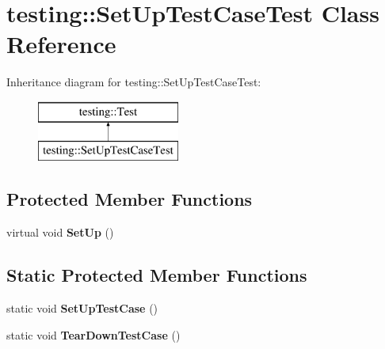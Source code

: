 \hypertarget{classtesting_1_1_set_up_test_case_test}{}\section{testing\+:\+:Set\+Up\+Test\+Case\+Test Class Reference}
\label{classtesting_1_1_set_up_test_case_test}
Inheritance diagram for testing\+:\+:Set\+Up\+Test\+Case\+Test\+:\begin{figure}[H]
\begin{center}
\leavevmode
\includegraphics[height=2.000000cm]{classtesting_1_1_set_up_test_case_test}
\end{center}
\end{figure}
\subsection*{Protected Member Functions}
\begin{DoxyCompactItemize}
\item 
\mbox{\label{classtesting_1_1_set_up_test_case_test_a4b44551ccf73e66de7ec95b2ab3b2085}} 
virtual void {\bfseries Set\+Up} ()
\end{DoxyCompactItemize}
\subsection*{Static Protected Member Functions}
\begin{DoxyCompactItemize}
\item 
\mbox{\label{classtesting_1_1_set_up_test_case_test_a50732abc0bcb3725e6dfd6a2d487e944}} 
static void {\bfseries Set\+Up\+Test\+Case} ()
\item 
\mbox{\label{classtesting_1_1_set_up_test_case_test_abdc133cd161ff2fa317f489da9bdccf3}} 
static void {\bfseries Tear\+Down\+Test\+Case} ()
\end{DoxyCompactItemize}
